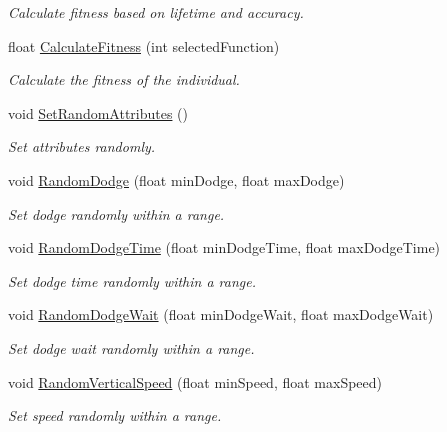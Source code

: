 \begin{DoxyCompactItemize}
\begin{DoxyCompactList}\small\item\em Calculate fitness based on lifetime and accuracy. \end{DoxyCompactList}\item 
float \mbox{\hyperlink{class_individual_a75dd9bebe96f8ff2bad0f60381926085}{Calculate\+Fitness}} (int selected\+Function)
\begin{DoxyCompactList}\small\item\em Calculate the fitness of the individual. \end{DoxyCompactList}\item 
void \mbox{\hyperlink{class_individual_aad9008e000af2bf09346be0ca9258116}{Set\+Random\+Attributes}} ()
\begin{DoxyCompactList}\small\item\em Set attributes randomly. \end{DoxyCompactList}\item 
void \mbox{\hyperlink{class_individual_a75271d202126e53879bdb51a9fe65ef3}{Random\+Dodge}} (float min\+Dodge, float max\+Dodge)
\begin{DoxyCompactList}\small\item\em Set dodge randomly within a range. \end{DoxyCompactList}\item 
void \mbox{\hyperlink{class_individual_a108e7c67d55c334bcc885e8dc5bb740b}{Random\+Dodge\+Time}} (float min\+Dodge\+Time, float max\+Dodge\+Time)
\begin{DoxyCompactList}\small\item\em Set dodge time randomly within a range. \end{DoxyCompactList}\item 
void \mbox{\hyperlink{class_individual_a1ac91351958ff89363dac0c16612f07d}{Random\+Dodge\+Wait}} (float min\+Dodge\+Wait, float max\+Dodge\+Wait)
\begin{DoxyCompactList}\small\item\em Set dodge wait randomly within a range. \end{DoxyCompactList}\item 
void \mbox{\hyperlink{class_individual_ab66822b58148ba1507d2e27aff8676e7}{Random\+Vertical\+Speed}} (float min\+Speed, float max\+Speed)
\begin{DoxyCompactList}\small\item\em Set speed randomly within a range. \end{DoxyCompactList}\item 

\end{DoxyCompactItemize}
